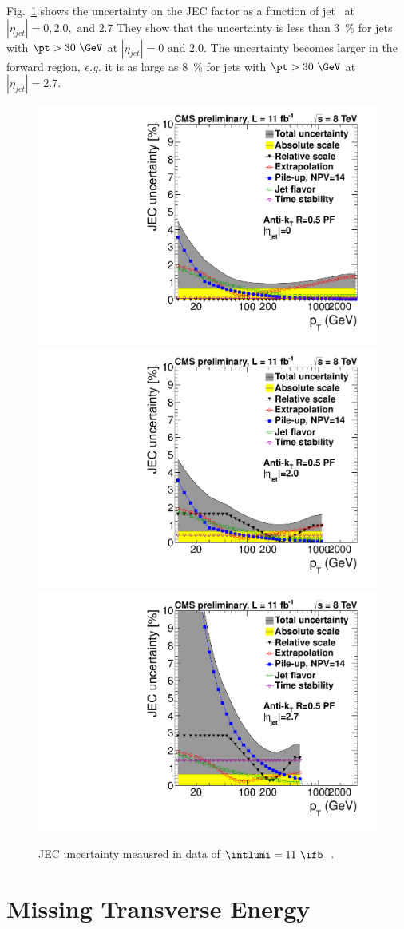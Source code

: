 Fig.~\ref{fig:jecuncert} shows the uncertainty on the JEC factor
as a function of jet \pt\ at $|\eta_{jet}|=0, 2.0, \textrm{ and }2.7$ 
They show that the uncertainty is less than 3~\% for jets with 
$\pt>30~\GeV$ at $|\eta_{jet}|=0 \textrm{ and } 2.0$. 
The uncertainty becomes larger in the forward region, 
\textit{e.g.} it is as large as 8~\% for jets with $\pt>30~\GeV$ at $|\eta_{jet}|=2.7$.  


\begin{figure}[!hbtp]
\centering
\includegraphics[width=.45\textwidth]{figures/JECUncert_Fall12_DATA_AK5PF_Eta00.pdf}
\includegraphics[width=.45\textwidth]{figures/JECUncert_Fall12_DATA_AK5PF_Eta20.pdf} \\
\includegraphics[width=.45\textwidth]{figures/JECUncert_Fall12_DATA_AK5PF_Eta27.pdf} 
\caption{JEC uncertainty meausred in data of $\intlumi=11~\ifb$~\cite{DPS-2013-011}.}
\label{fig:jecuncert}
\end{figure}



\section{ Missing Transverse Energy }

